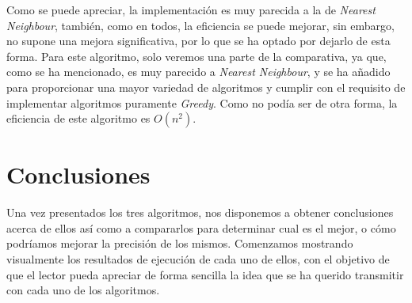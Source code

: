 \documentclass[11pt,openany]{book}
\begin{document}
Como se puede apreciar, la implementación es muy parecida a la de \textit{Nearest Neighbour},
también, como en todos, la eficiencia se puede mejorar, sin embargo, no supone una mejora
significativa, por lo que se ha optado por dejarlo de esta forma. Para este algoritmo, solo
veremos una parte de la comparativa, ya que, como se ha mencionado, es muy parecido a
\textit{Nearest Neighbour}, y se ha añadido para proporcionar una mayor variedad de algoritmos
y cumplir con el requisito de implementar algoritmos puramente \textit{Greedy}.
Como no podía ser de otra forma, la eficiencia de este algoritmo es $O(n^2)$.


\section{Conclusiones}
Una vez presentados los tres algoritmos, nos disponemos a obtener conclusiones acerca
de ellos así como a compararlos para determinar cual es el mejor, o cómo podríamos
mejorar la precisión de los mismos. Comenzamos mostrando visualmente los resultados
de ejecución de cada uno de ellos, con el objetivo de que el lector pueda apreciar 
de forma sencilla la idea que se ha querido transmitir con cada uno de los algoritmos.
\end{document}
